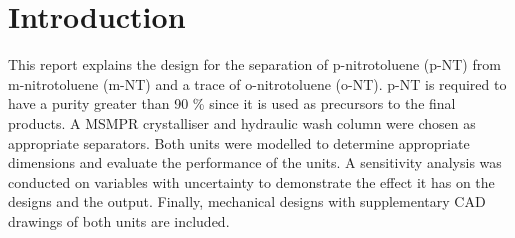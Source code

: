 \section{Introduction}

This report explains the design for the separation of p-nitrotoluene (p-NT) from m-nitrotoluene (m-NT) and a trace of o-nitrotoluene (o-NT). p-NT is required to have a purity greater than 90 \% since it is used as precursors to the final products. A MSMPR crystalliser and hydraulic wash column were chosen as appropriate separators. Both units were modelled to determine appropriate dimensions and evaluate the performance of the units. A sensitivity analysis was conducted on variables with uncertainty to demonstrate the effect it has on the designs and the output. Finally, mechanical designs with supplementary CAD drawings of both units are included. 